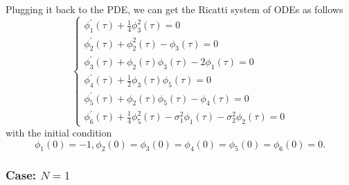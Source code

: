 \documentclass{article}
\begin{document}
Plugging it back to the PDE, we can get the Ricatti system of ODEs as follows
\begin{equation*}
    \begin{cases}
   \phi_{1}^{'} (\tau) + \frac{1}{4} \phi_{3}^{2}(\tau) = 0 \\
   \phi_{2}^{'} (\tau) + \phi_{2}^{2}(\tau) - \phi_{3}(\tau) = 0 \\
   \phi_{3}^{'} (\tau) + \phi_{2}(\tau)\phi_{3}(\tau) - 2 \phi_{1}(\tau) = 0 \\
   \phi_{4}^{'} (\tau) + \frac{1}{2} \phi_{3} (\tau) \phi_{5}(\tau) = 0 \\
   \phi_{5}^{'} (\tau) + \phi_{2} (\tau) \phi_{5}(\tau) - \phi_{4}(\tau) = 0 \\
   \phi_{6}^{'} (\tau) + \frac{1}{4} \phi_{5}^{2} (\tau) - \sigma_{1}^{2} \phi_{1}(\tau) - \sigma_{2}^{2} \phi_{2}(\tau) = 0
   \end{cases}
\end{equation*}
with the initial condition
\begin{equation*}
    \phi_{1}(0) = -1, \phi_{2}(0) = \phi_{3}(0) = \phi_{4}(0) = \phi_{5}(0) = \phi_{6}(0) = 0.
\end{equation*}

\subsubsection{Case: $N = 1$}
\end{document}

